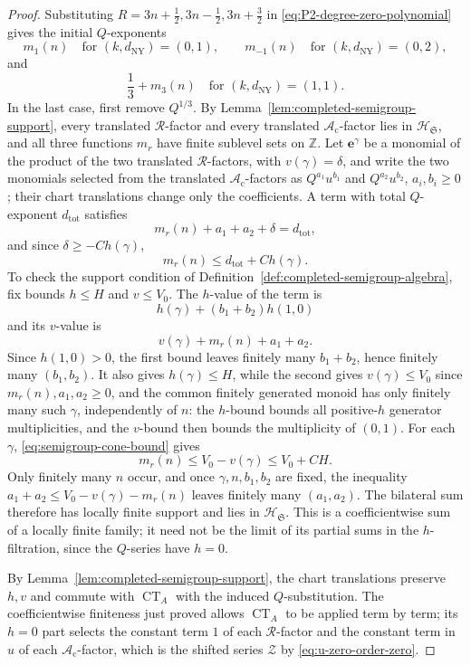 \documentclass{amsart}
\theoremstyle{definition}
\numberwithin{equation}{section}
\newcommand{\Z}{\mathbb Z}
\begin{document}
\begin{proof}
Substituting \(R=3n+\tfrac12,3n-\tfrac12,3n+\tfrac32\) in \eqref{eq:P2-degree-zero-polynomial} gives the initial \(Q\)-exponents
\[
 m_1(n)
 \quad\text{for }(k,d_{\mathrm{NY}})=(0,1),\qquad
 m_{-1}(n)
 \quad\text{for }(k,d_{\mathrm{NY}})=(0,2),
\]
and
\[
 \frac13+m_3(n)
 \quad\text{for }(k,d_{\mathrm{NY}})=(1,1).
\]
In the last case, first remove \(Q^{1/3}\).  By Lemma~\ref{lem:completed-semigroup-support}, every translated \(\mathcal R\)-factor and every translated \(\mathscr A_{\mathrm c}\)-factor lies in \(\mathscr H_{\mathfrak S}\), and all three functions \(m_r\) have finite sublevel sets on \(\Z\).  Let \(\mathbf e^\gamma\) be a monomial of the product of the two translated \(\mathcal R\)-factors, with \(v(\gamma)=\delta\), and write the two monomials selected from the translated \(\mathscr A_{\mathrm c}\)-factors as \(Q^{a_1}u^{b_1}\) and \(Q^{a_2}u^{b_2}\), \(a_i,b_i\geq0\); their chart translations change only the coefficients.  A term with total \(Q\)-exponent \(d_{\mathrm{tot}}\) satisfies
\[
 m_r(n)+a_1+a_2+\delta=d_{\mathrm{tot}},
\]
and since \(\delta\geq-Ch(\gamma)\),
\[
 m_r(n)\leq d_{\mathrm{tot}}+Ch(\gamma).
\]
To check the support condition of Definition~\ref{def:completed-semigroup-algebra}, fix bounds \(h\leq H\) and \(v\leq V_0\).  The \(h\)-value of the term is
\[
 h(\gamma)+(b_1+b_2)h(1,0)
\]
and its \(v\)-value is
\[
 v(\gamma)+m_r(n)+a_1+a_2.
\]
Since \(h(1,0)>0\), the first bound leaves finitely many \(b_1+b_2\), hence finitely many \((b_1,b_2)\).  It also gives \(h(\gamma)\leq H\), while the second gives \(v(\gamma)\leq V_0\) since \(m_r(n),a_1,a_2\geq0\), and the common finitely generated monoid has only finitely many such \(\gamma\), independently of \(n\): the \(h\)-bound bounds all positive-\(h\) generator multiplicities, and the \(v\)-bound then bounds the multiplicity of \((0,1)\).  For each \(\gamma\), \eqref{eq:semigroup-cone-bound} gives
\[
 m_r(n)\leq V_0-v(\gamma)\leq V_0+CH.
\]
Only finitely many \(n\) occur, and once \(\gamma,n,b_1,b_2\) are fixed, the inequality \(a_1+a_2\leq V_0-v(\gamma)-m_r(n)\) leaves finitely many \((a_1,a_2)\).  The bilateral sum therefore has locally finite support and lies in \(\mathscr H_{\mathfrak S}\).  This is a coefficientwise sum of a locally finite family; it need not be the limit of its partial sums in the \(h\)-filtration, since the \(Q\)-series have \(h=0\).

By Lemma~\ref{lem:completed-semigroup-support}, the chart translations preserve \(h,v\) and commute with \(\operatorname{CT}_A\) with the induced \(Q\)-substitution.  The coefficientwise finiteness just proved allows \(\operatorname{CT}_A\) to be applied term by term; its \(h=0\) part selects the constant term \(1\) of each \(\mathcal R\)-factor and the constant term in \(u\) of each \(\mathscr A_{\mathrm c}\)-factor, which is the shifted series \(\mathcal Z\) by \eqref{eq:u-zero-order-zero}.
\end{proof}
\end{document}
